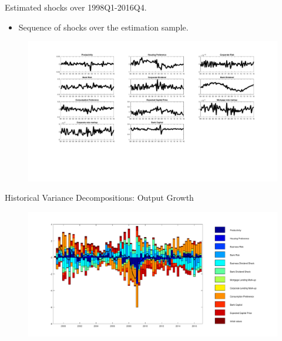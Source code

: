\documentclass[8pt,aspectratio=169]{beamer}
\numberwithin{equation}{section}
\begin{document}
\begin{frame}{Estimated shocks over 1998Q1-2016Q4.}

\begin{itemize}
\item Sequence of shocks over the estimation sample. 

\end{itemize}
\begin{figure}[H]
\includegraphics[scale=0.3]{smoothed_shocks.pdf}
\end{figure}

\end{frame}



\begin{frame}{Historical Variance Decompositions: Output   Growth }



\begin{figure}
\includegraphics[scale=0.36]{decomp_dy.pdf}
\end{figure}
\end{frame}
\end{document}
